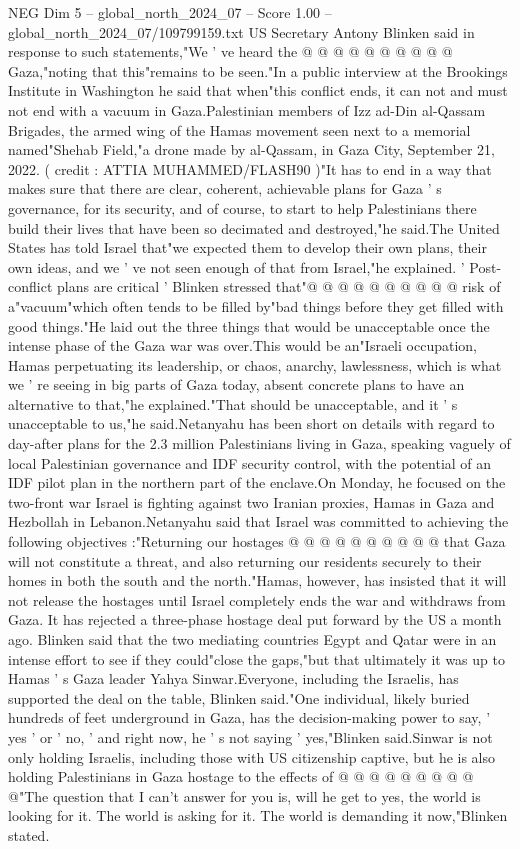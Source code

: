 \begin{textsample}{NEG Dim 5 – global\_north\_2024\_07 – Score 1.00 – global\_north\_2024\_07/109799159.txt}
US Secretary Antony Blinken said in response to such statements,"We ' ve heard the @ @ @ @ @ @ @ @ @ @ Gaza,"noting that this"remains to be seen."In a public interview at the Brookings Institute in Washington he said that when"this conflict ends, it can not and must not end with a vacuum in Gaza.Palestinian members of Izz ad-Din al-Qassam Brigades, the armed wing of the Hamas movement seen next to a memorial named"Shehab Field,"a drone made by al-Qassam, in Gaza City, September 21, 2022. ( credit : ATTIA MUHAMMED/FLASH90 )"It has to end in a way that makes sure that there are clear, coherent, achievable plans for Gaza ' s governance, for its security, and of course, to start to help Palestinians there build their lives that have been so decimated and destroyed,"he said.The United States has told Israel that"we expected them to develop their own plans, their own ideas, and we ' ve not seen enough of that from Israel,"he explained. ' Post-conflict plans are critical ' Blinken stressed that"@ @ @ @ @ @ @ @ @ @ risk of a"vacuum"which often tends to be filled by"bad things before they get filled with good things."He laid out the three things that would be unacceptable once the intense phase of the Gaza war was over.This would be an"Israeli occupation, Hamas perpetuating its leadership, or chaos, anarchy, lawlessness, which is what we ' re seeing in big parts of Gaza today, absent concrete plans to have an alternative to that,"he explained."That should be unacceptable, and it ' s unacceptable to us,"he said.Netanyahu has been short on details with regard to day-after plans for the 2.3 million Palestinians living in Gaza, speaking vaguely of local Palestinian governance and IDF security control, with the potential of an IDF pilot plan in the northern part of the enclave.On Monday, he focused on the two-front war Israel is fighting against two Iranian proxies, Hamas in Gaza and Hezbollah in Lebanon.Netanyahu said that Israel was committed to achieving the following objectives :"Returning our hostages @ @ @ @ @ @ @ @ @ @ that Gaza will not constitute a threat, and also returning our residents securely to their homes in both the south and the north."Hamas, however, has insisted that it will not release the hostages until Israel completely ends the war and withdraws from Gaza.
It has rejected a three-phase hostage deal put forward by the US a month ago.
Blinken said that the two mediating countries Egypt and Qatar were in an intense effort to see if they could"close the gaps,"but that ultimately it was up to Hamas ' s Gaza leader Yahya Sinwar.Everyone, including the Israelis, has supported the deal on the table, Blinken said."One individual, likely buried hundreds of feet underground in Gaza, has the decision-making power to say, ' yes ' or ' no, ' and right now, he ' s not saying ' yes,"Blinken said.Sinwar is not only holding Israelis, including those with US citizenship captive, but he is also holding Palestinians in Gaza hostage to the effects of @ @ @ @ @ @ @ @ @ @"The question that I can't answer for you is, will he get to yes, the world is looking for it.
The world is asking for it.
The world is demanding it now,"Blinken stated.

\end{textsample}
